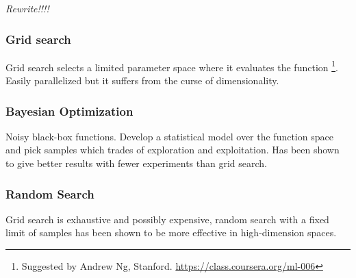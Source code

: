 \textit{Rewrite!!!!}

\subsubsection{Grid search}

Grid search selects a limited parameter space where it evaluates the function \footnote{Suggested by Andrew Ng, Stanford. \url{https://class.coursera.org/ml-006}}. Easily parallelized but it suffers from the curse of dimensionality.


\subsubsection{Bayesian Optimization}

Noisy black-box functions. Develop a statistical model over the function space and pick samples which trades of exploration and exploitation. Has been shown \citep{snoek2012practical} to give better results with fewer experiments than grid search.


\subsubsection{Random Search}

Grid search is exhaustive and possibly expensive, random search with a fixed limit of samples has been shown to be more effective in high-dimension spaces. \citep{bergstra2012random}





